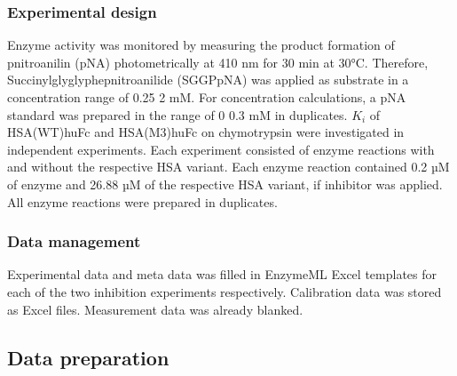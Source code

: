 \documentclass[letterpaper,12pt,english]{jupyterBook}
\begin{document}
\subsubsection{Experimental design}
\label{\detokenize{scenarios/chymotrypsin_inhibition:experimental-design}}
\sphinxAtStartPar
Enzyme activity was monitored by measuring the product formation of p\sphinxhyphen{}nitroanilin (p\sphinxhyphen{}NA) photometrically at 410 nm for 30 min at 30°C. Therefore, Succinyl\sphinxhyphen{}gly\sphinxhyphen{}gly\sphinxhyphen{}phe\sphinxhyphen{}p\sphinxhyphen{}nitroanilide (SGGPpNA) was applied as substrate in a concentration range of 0.25 \sphinxhyphen{} 2 mM. For concentration calculations, a p\sphinxhyphen{}NA standard was prepared in the range of 0 \sphinxhyphen{} 0.3 mM in duplicates. \(K_{i}\) of HSA(WT)\sphinxhyphen{}huFc and HSA(M3)\sphinxhyphen{}huFc on chymotrypsin were investigated in independent experiments. Each experiment consisted of enzyme reactions with and without the respective HSA variant. Each enzyme reaction contained 0.2 µM of enzyme and 26.88 µM of the respective HSA variant, if inhibitor was applied. All enzyme reactions were prepared in duplicates.


\subsubsection{Data management}
\label{\detokenize{scenarios/chymotrypsin_inhibition:data-management}}
\sphinxAtStartPar
Experimental data and meta data was filled in EnzymeML Excel templates for each of the two inhibition experiments respectively. Calibration data was stored as Excel files. Measurement data was already blanked.


\subsection{Data preparation}
\label{\detokenize{scenarios/chymotrypsin_inhibition:data-preparation}}
\end{document}

